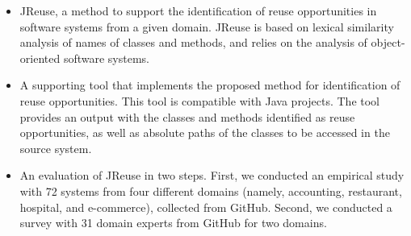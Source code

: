 \begin{itemize}
\item JReuse, a method to support the identification of reuse opportunities in software systems from a given domain. JReuse is based on lexical similarity analysis of names of classes and methods, and relies on the analysis of object-oriented software systems.

\item A supporting tool that implements the proposed method for identification of reuse opportunities. This tool is compatible with Java projects. The tool provides an output with the classes and methods identified as reuse opportunities, as well as absolute paths of the classes to be accessed in the source system.

\item An evaluation of JReuse in two steps. First, we conducted an empirical study with 72 systems from four different domains (namely, accounting, restaurant, hospital, and e-commerce), collected from GitHub. Second, we conducted a survey with 31  domain experts from GitHub for two domains.


\end{itemize}

